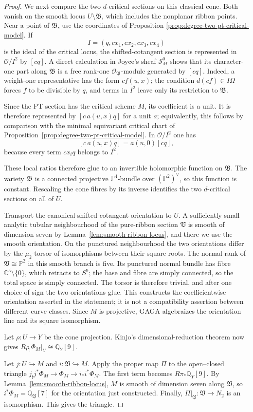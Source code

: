 \documentclass[11pt,reqno]{amsart}
\theoremstyle{definition}
\newcommand{\C}{\mathbb C}
\newcommand{\Q}{\mathbb Q}
\newcommand{\Pp}{\mathbb P}
\newcommand{\Ocal}{\mathcal O}
\begin{document}
\begin{proof}
We next compare the two $d$-critical sections on this classical cone.  Both
vanish on the smooth locus $U\setminus\mathfrak B$, which includes the
nonplanar ribbon points.  Near a point of $\mathfrak B$,
use the coordinates of Proposition
\ref{prop:degree-two-pt-critical-model}.  If
\[
 I=(q,cx_1,cx_2,cx_3,cx_4)
\]
is the ideal of the critical locus, the shifted-cotangent section is
represented in $\Ocal/I^2$ by $[cq]$.  A direct calculation in Joyce's
sheaf $\mathcal S_M^0$ shows that its character-one part along
$\mathfrak B$ is a free rank-one $\Ocal_{\mathfrak B}$-module generated by
$[cq]$.  Indeed, a weight-one representative has the form $cf(u,x)$; the
condition $d(cf)\in I\Omega$ forces $f$ to be divisible by $q$, and terms
in $I^2$ leave only its restriction to $\mathfrak B$.

Since the PT
section has the critical scheme $M$, its coefficient is a unit.  It is
therefore represented by $[c\,a(u,x)q]$ for a unit $a$; equivalently, this
follows by comparison with the minimal equivariant critical chart of
Proposition~\ref{prop:degree-two-pt-critical-model}.  In $\Ocal/I^2$
one has
\[
 [c\,a(u,x)q]=a(u,0)[cq],
\]
because every term $cx_iq$ belongs to $I^2$.

These local ratios therefore
glue to an invertible holomorphic function on $\mathfrak B$.  The variety
$\mathfrak B$ is a connected projective $\Pp^4$-bundle over
$(\Pp^2)^\vee$, so this function is constant.  Rescaling the cone fibres
by its inverse identifies the two $d$-critical sections on all of $U$.

Transport the canonical shifted-cotangent orientation to $U$.  A
sufficiently small analytic tubular neighbourhood of the pure-ribbon
section $\mathfrak V$ is smooth of dimension seven by
Lemma~\ref{lem:smooth-ribbon-locus}, and there we use the smooth
orientation.  On the punctured neighbourhood the two orientations differ by
the $\mu_2$-torsor of isomorphisms between their square roots.  The normal
rank of $\mathfrak V\cong\Pp^2$ in this smooth branch is five.  Its punctured
normal bundle has fibre $\C^5\setminus\{0\}$, which retracts to $S^9$; the
base and fibre are simply connected, so the total space is simply connected.
The torsor is therefore trivial, and after one choice of sign the two
orientations glue.  This constructs the
coefficientwise orientation asserted in the statement; it is not a
compatibility assertion between different curve classes.  Since $M$ is
projective, GAGA algebraizes the orientation line and its square
isomorphism.

Let $\rho:U\to Y$ be the cone projection.  Kinjo's
dimensional-reduction theorem \cite[Theorem~3.1]{Kinjo} now gives
$R\rho_!\Phi_M|_U\cong\Q_Y[9]$.

Let $j:U\hookrightarrow M$ and $i:\mathfrak V\hookrightarrow M$.  Apply the
proper map $\Pi$ to the open--closed triangle
$j_!j^*\Phi_M\to\Phi_M\to i_*i^*\Phi_M$.  The first term becomes
$R\pi_*\Q_Y[9]$.  By Lemma~\ref{lem:smooth-ribbon-locus}, $M$ is smooth of
dimension seven along $\mathfrak V$, so
$i^*\Phi_M=\Q_{\mathfrak V}[7]$ for the orientation just constructed.
Finally,
$\Pi|_{\mathfrak V}:\mathfrak V\to N_2$ is an isomorphism.  This gives the
triangle.
\end{proof}
\end{document}
